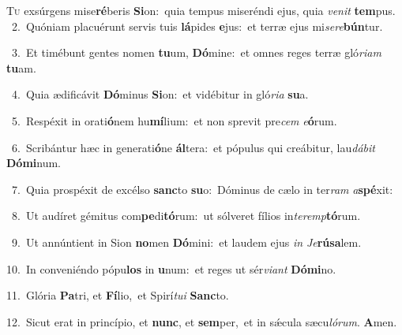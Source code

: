 \lettrine{\initial\textcolor{\initialcolor}{T}}{u} exsúrgens mise\-\textbf{ré}\-beris \textbf{Si}\-on:~\star quia tempus miseréndi ejus, quia \textit{ve}\-\textit{nit} \textbf{tem}\-pus.\\
{\numbfont\textcolor{\numbcolor}{~2.}}~Quóniam placuérunt servis tuis \textbf{lá}\-pides \textbf{e}\-jus:~\star et terræ ejus mi\-\textit{se}\-\textit{re}\textbf{bún}tur.\par
{\numbfont\textcolor{\numbcolor}{~3.}}~Et timébunt gentes nomen \textbf{tu}\-um, \textbf{Dó}\-mine:~\star et omnes reges terræ gló\-\textit{ri}\-\textit{am} \textbf{tu}\-am.\par
{\numbfont\textcolor{\numbcolor}{~4.}}~Quia ædificávit \textbf{Dó}\-minus \textbf{Si}\-on:~\star et vidébitur in gló\-\textit{ri}\-\textit{a} \textbf{su}\-a.\par
{\numbfont\textcolor{\numbcolor}{~5.}}~Respéxit in orati\-\textbf{ó}\-nem hu\-\textbf{mí}\-lium:~\star et non sprevit pre\textit{cem} \textit{e}\-\textbf{ó}rum.\par
{\numbfont\textcolor{\numbcolor}{~6.}}~Scribántur hæc in generati\-\textbf{ó}\-ne \textbf{ál}\-tera:~\star et pópulus qui creábitur, lau\-\textit{dá}\-\textit{bit} \textbf{Dó}\-\textbf{mi}num.\par
{\numbfont\textcolor{\numbcolor}{~7.}}~Quia prospéxit de excélso \textbf{sanc}\-to \textbf{su}\-o:~\star Dóminus de cælo in ter\textit{ram} \textit{a}\-\textbf{spé}xit:\par
{\numbfont\textcolor{\numbcolor}{~8.}}~Ut audíret gémitus com\-\textbf{pe}\-di\-\textbf{tó}\-rum:~\star ut sólveret fílios in\-\textit{ter}\-\textit{emp}\textbf{tó}rum.\par
{\numbfont\textcolor{\numbcolor}{~9.}}~Ut annúntient in Sion \textbf{no}\-men \textbf{Dó}\-mini:~\star et laudem ejus \textit{in} \textit{Je}\-\textbf{rú}\textbf{sa}lem.\par
{\numbfont\textcolor{\numbcolor}{10.}}~In conveniéndo pópu\textbf{los} in \textbf{u}\-num:~\star et reges ut sér\-\textit{vi}\-\textit{ant} \textbf{Dó}\-\textbf{mi}no.\par
{\numbfont\textcolor{\numbcolor}{11.}}~Glória \textbf{Pa}\-tri, et \textbf{Fí}\-lio,~\star et Spirí\-\textit{tu}\-\textit{i} \textbf{Sanc}\-to.\par
{\numbfont\textcolor{\numbcolor}{12.}}~Sicut erat in princípio, et \textbf{nunc}\-, et \textbf{sem}\-per,~\star et in sǽcula sæcu\-\textit{ló}\-\textit{rum}. \textbf{A}\-men.\par
